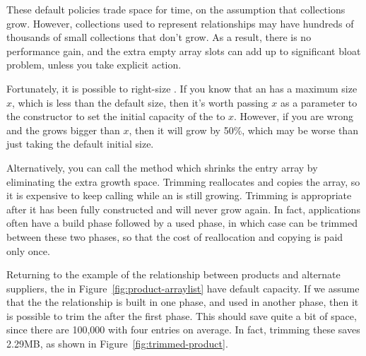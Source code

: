 These default policies trade space
for time, on the assumption that collections grow. However,
collections used to represent relationships may have hundreds of thousands of
small collections that don't grow. As a result, there is no performance gain, and the extra
empty array slots can add up to significant bloat problem, unless you take
explicit action.

 Fortunately, it is possible to right-size
 . If you know that an  has a maximum size
 $x$, which is less than the default size, then it's worth passing $x$ as a
 parameter to the constructor to set the initial capacity of the
  to $x$. However, if you are wrong and the 
 grows bigger than $x$, then it will grow by 50\%, which may
 be worse than just taking the default initial size.
 
 Alternatively, you can call the  method which shrinks the
 entry array by eliminating the extra growth space. Trimming reallocates and
 copies the array, so it is expensive to keep calling  while an
  is still growing. Trimming is appropriate after
 it has been fully constructed and will never grow again. In fact, applications
 often have a build phase followed by a used phase, in which case
  can be trimmed between these two phases, so that the cost of reallocation 
 and copying is paid only once.
 
 Returning to the example of the relationship between products and alternate
 suppliers, the  in Figure~\ref{fig:product-arraylist} have
  default capacity. If we assume that the the relationship is built in one
  phase, and used in another phase, then it is possible to trim the
   after the first phase. This should save quite a bit of
  space, since there are 100,000  with four entries on
  average. In fact, trimming these
  saves 2.29MB, as shown in
 Figure~\ref{fig:trimmed-product}. 


